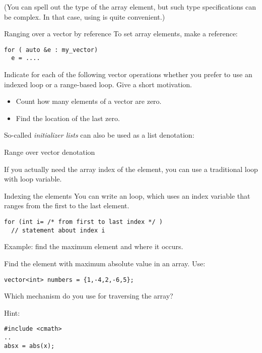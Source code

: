 (You can spell out the type of the array element, but such type
specifications can be complex. In that case, using  is
quite convenient.)

\begin{block}{Ranging over a vector by reference}
  \label{sl:vector-range-ref}
To set array elements, make  a reference:
\begin{lstlisting}
for ( auto &e : my_vector)
  e = ....
\end{lstlisting}
\end{block}

\begin{exercise}
  \label{ex:range-for}
  Indicate for each of the following vector operations whether you
  prefer to use an indexed loop or a range-based loop. Give a short
  motivation.
  \begin{itemize}
  \item Count how many elements of a vector are zero.
  \item Find the location of the last zero.
  \end{itemize}
\end{exercise}

So-called \emph{initializer lists}
can also be used as a list denotation:

\begin{block}{Range over vector denotation}
  \label{sl:range-denote}
\end{block}

If you actually need the array index of the element, you can use a
traditional  loop with loop variable.

\begin{block}{Indexing the elements}
  \label{sl:index-range}
  You can write an  loop, which uses an
  index variable that ranges from the first to the last element.
\begin{lstlisting}
for (int i= /* from first to last index */ )
  // statement about index i
\end{lstlisting}
Example: find the maximum element and where it occurs.
%
\end{block}

\begin{exercise}
  \label{ex:array-max}
  Find the element with maximum absolute value in an array. Use:
\begin{lstlisting}
vector<int> numbers = {1,-4,2,-6,5};
\end{lstlisting}
Which mechanism do you use for traversing the array?

Hint:
\begin{lstlisting}
#include <cmath>
..
absx = abs(x);
\end{lstlisting}
\end{exercise}

